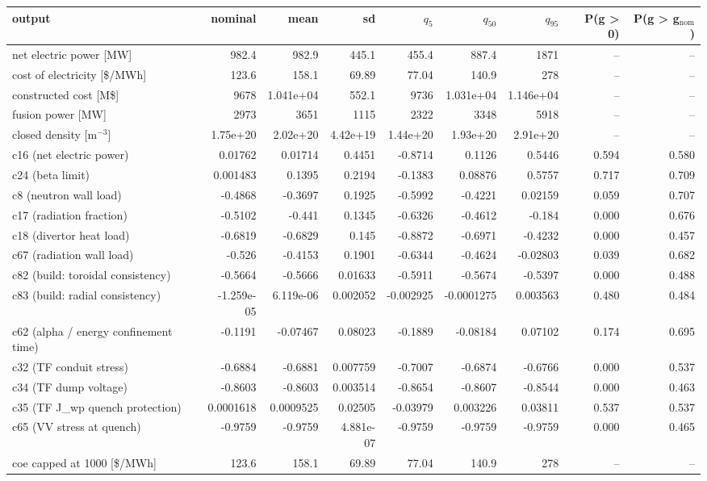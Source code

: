 \begin{tabular}{lrrrrrrrr}
\toprule
output & nominal & mean & sd & $q_{5}$ & $q_{50}$ & $q_{95}$ & P(g > 0) & P(g > g$_\mathrm{nom}$) \\
\midrule
net electric power [MW] & 982.4 & 982.9 & 445.1 & 455.4 & 887.4 & 1871 & -- & -- \\
cost of electricity [\$/MWh] & 123.6 & 158.1 & 69.89 & 77.04 & 140.9 & 278 & -- & -- \\
constructed cost [M\$] & 9678 & 1.041e+04 & 552.1 & 9736 & 1.031e+04 & 1.146e+04 & -- & -- \\
fusion power [MW] & 2973 & 3651 & 1115 & 2322 & 3348 & 5918 & -- & -- \\
closed density [m$^{-3}$] & 1.75e+20 & 2.02e+20 & 4.42e+19 & 1.44e+20 & 1.93e+20 & 2.91e+20 & -- & -- \\
c16 (net electric power) & 0.01762 & 0.01714 & 0.4451 & -0.8714 & 0.1126 & 0.5446 & 0.594 & 0.580 \\
c24 (beta limit) & 0.001483 & 0.1395 & 0.2194 & -0.1383 & 0.08876 & 0.5757 & 0.717 & 0.709 \\
c8 (neutron wall load) & -0.4868 & -0.3697 & 0.1925 & -0.5992 & -0.4221 & 0.02159 & 0.059 & 0.707 \\
c17 (radiation fraction) & -0.5102 & -0.441 & 0.1345 & -0.6326 & -0.4612 & -0.184 & 0.000 & 0.676 \\
c18 (divertor heat load) & -0.6819 & -0.6829 & 0.145 & -0.8872 & -0.6971 & -0.4232 & 0.000 & 0.457 \\
c67 (radiation wall load) & -0.526 & -0.4153 & 0.1901 & -0.6344 & -0.4624 & -0.02803 & 0.039 & 0.682 \\
c82 (build: toroidal consistency) & -0.5664 & -0.5666 & 0.01633 & -0.5911 & -0.5674 & -0.5397 & 0.000 & 0.488 \\
c83 (build: radial consistency) & -1.259e-05 & 6.119e-06 & 0.002052 & -0.002925 & -0.0001275 & 0.003563 & 0.480 & 0.484 \\
c62 (alpha / energy confinement time) & -0.1191 & -0.07467 & 0.08023 & -0.1889 & -0.08184 & 0.07102 & 0.174 & 0.695 \\
c32 (TF conduit stress) & -0.6884 & -0.6881 & 0.007759 & -0.7007 & -0.6874 & -0.6766 & 0.000 & 0.537 \\
c34 (TF dump voltage) & -0.8603 & -0.8603 & 0.003514 & -0.8654 & -0.8607 & -0.8544 & 0.000 & 0.463 \\
c35 (TF J\_wp quench protection) & 0.0001618 & 0.0009525 & 0.02505 & -0.03979 & 0.003226 & 0.03811 & 0.537 & 0.537 \\
c65 (VV stress at quench) & -0.9759 & -0.9759 & 4.881e-07 & -0.9759 & -0.9759 & -0.9759 & 0.000 & 0.465 \\
coe capped at 1000 [\$/MWh] & 123.6 & 158.1 & 69.89 & 77.04 & 140.9 & 278 & -- & -- \\
\bottomrule
\end{tabular}
